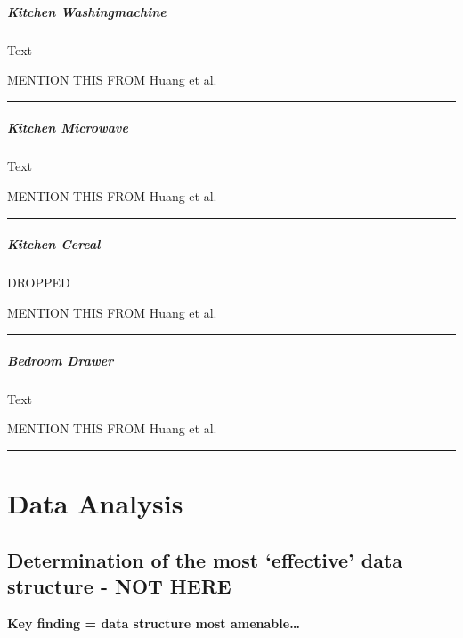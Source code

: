 \documentclass[11pt]{article}
\begin{document}
    \hypertarget{kitchen-washingmachine}{%
\subparagraph{Kitchen Washingmachine}\label{kitchen-washingmachine}}

    Text

    MENTION THIS FROM Huang et al.~

\begin{center}\rule{0.5\linewidth}{\linethickness}\end{center}

    \hypertarget{kitchen-microwave}{%
\subparagraph{Kitchen Microwave}\label{kitchen-microwave}}

    Text

    MENTION THIS FROM Huang et al.~

\begin{center}\rule{0.5\linewidth}{\linethickness}\end{center}

    \hypertarget{kitchen-cereal}{%
\subparagraph{Kitchen Cereal}\label{kitchen-cereal}}

    DROPPED

    MENTION THIS FROM Huang et al.~

\begin{center}\rule{0.5\linewidth}{\linethickness}\end{center}

    \hypertarget{bedroom-drawer}{%
\subparagraph{Bedroom Drawer}\label{bedroom-drawer}}

    Text

    MENTION THIS FROM Huang et al.~

\begin{center}\rule{0.5\linewidth}{\linethickness}\end{center}

    \hypertarget{data-analysis}{%
\section{Data Analysis}\label{data-analysis}}

    \hypertarget{determination-of-the-most-effective-data-structure---not-here}{%
\subsection{Determination of the most `effective' data structure - NOT
HERE}\label{determination-of-the-most-effective-data-structure---not-here}}

    \textbf{Key finding = data structure most amenable\ldots{}}
\end{document}
